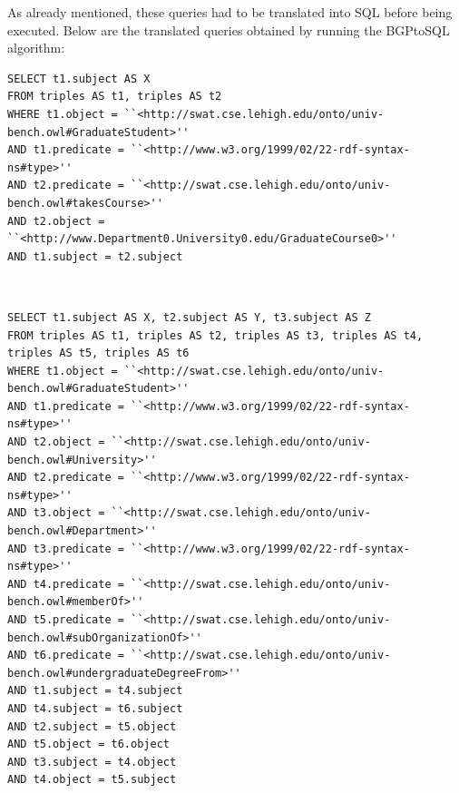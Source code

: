 \documentclass[10pt, a4paper]{report}
\begin{document}
As already mentioned, these queries had to be translated into SQL before being executed. Below are the translated queries obtained by running the BGPtoSQL algorithm: \\

\begin{enumerate}
	\begin{minipage}{0.92\textwidth}
		\item \label{query:lumb_sql_1}
		\lstset{language=sql}
		\begin{lstlisting}
SELECT t1.subject AS X
FROM triples AS t1, triples AS t2
WHERE t1.object = ``<http://swat.cse.lehigh.edu/onto/univ-bench.owl#GraduateStudent>''
AND t1.predicate = ``<http://www.w3.org/1999/02/22-rdf-syntax-ns#type>''
AND t2.predicate = ``<http://swat.cse.lehigh.edu/onto/univ-bench.owl#takesCourse>''
AND t2.object = ``<http://www.Department0.University0.edu/GraduateCourse0>''
AND t1.subject = t2.subject
                        \end{lstlisting}
	\end{minipage} \\
	\begin{minipage}{0.92\textwidth}
		\item \label{query:lumb_sql_2}
		\lstset{language=sql}
		\begin{lstlisting}
SELECT t1.subject AS X, t2.subject AS Y, t3.subject AS Z
FROM triples AS t1, triples AS t2, triples AS t3, triples AS t4, triples AS t5, triples AS t6
WHERE t1.object = ``<http://swat.cse.lehigh.edu/onto/univ-bench.owl#GraduateStudent>''
AND t1.predicate = ``<http://www.w3.org/1999/02/22-rdf-syntax-ns#type>''
AND t2.object = ``<http://swat.cse.lehigh.edu/onto/univ-bench.owl#University>''
AND t2.predicate = ``<http://www.w3.org/1999/02/22-rdf-syntax-ns#type>''
AND t3.object = ``<http://swat.cse.lehigh.edu/onto/univ-bench.owl#Department>''
AND t3.predicate = ``<http://www.w3.org/1999/02/22-rdf-syntax-ns#type>''
AND t4.predicate = ``<http://swat.cse.lehigh.edu/onto/univ-bench.owl#memberOf>''
AND t5.predicate = ``<http://swat.cse.lehigh.edu/onto/univ-bench.owl#subOrganizationOf>''
AND t6.predicate = ``<http://swat.cse.lehigh.edu/onto/univ-bench.owl#undergraduateDegreeFrom>''
AND t1.subject = t4.subject
AND t4.subject = t6.subject
AND t2.subject = t5.object
AND t5.object = t6.object
AND t3.subject = t4.object
AND t4.object = t5.subject
                        \end{lstlisting}
	\end{minipage} \\
	\begin{minipage}{0.92\textwidth}

\end{minipage}
\end{enumerate}
\end{document}
